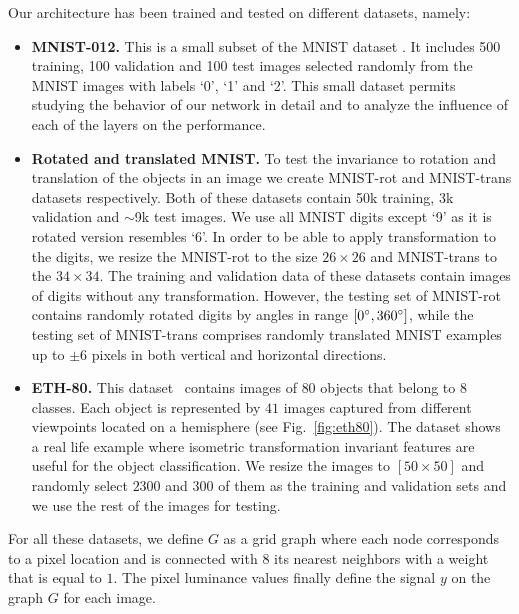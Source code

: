 \documentclass[10pt,journal,compsoc]{IEEEtran}
\begin{document}
	Our architecture has been trained and tested on different datasets, namely:
	\begin{itemize}[topsep=0pt, partopsep=0pt]
		\setlength\itemsep{0pt}
		\setlength{\parskip}{1pt}
		\item \textbf{MNIST-012.}
		This is a small subset of the MNIST dataset \cite{bb:lecun-mnisthandwrittendigit-2010}. It includes 500 training, 100 validation and 100 test images selected randomly from the MNIST images
		with labels `0', `1' and `2'. This small dataset permits studying the behavior of our network in detail and to analyze the influence of each of the layers on the performance.
		\item
		\textbf{Rotated and translated MNIST.}
		To test the invariance to rotation and translation of the objects in an image
		we create MNIST-rot and MNIST-trans datasets respectively.
		Both of these datasets contain 50k training, 3k validation and $\sim$9k test images. We use all MNIST digits \cite{bb:lecun-mnisthandwrittendigit-2010} except `9' as it is rotated version resembles `6'.
		In order to be able to apply transformation to the digits, we resize the MNIST-rot to the size $26 \times 26$ and MNIST-trans to the $34 \times 34$.
		The training and validation data of these datasets contain images of digits without any transformation. However, the testing set of  MNIST-rot contains randomly rotated digits by angles in range $[0\degree, 360\degree]$, while the testing set of MNIST-trans comprises randomly translated MNIST examples up to $\pm 6$ pixels in both vertical and horizontal directions.
		\item
		\textbf{ETH-80.}
		This dataset~\cite{bb:ETH80} contains images of $80$ objects that belong to $8$ classes. Each object is represented by $41$ images captured from different viewpoints located on a hemisphere (see Fig.~\ref{fig:eth80}). The dataset shows a real life example where isometric transformation invariant features are useful for the object classification. We resize the images to $[50 \times 50]$ and randomly select $2300$ and $300$ of them as the training and validation sets and we use the rest of the images for testing.
	\end{itemize}
	\noindent
	For all these datasets, we define $G$ as a grid graph where each node corresponds to a pixel location and is connected with 8 its nearest neighbors with a weight that is equal to $1$. The pixel luminance values finally define the signal $y$ on the graph $G$ for each image.
\end{document}
